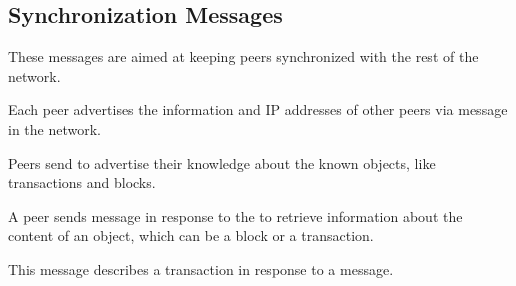 \subsection{Synchronization Messages}
These messages are aimed at keeping \bc peers synchronized with the rest of the \bc network. %

Each peer advertises the information and IP addresses of other peers via  message in the network. %

 Peers send  to advertise their knowledge about the known objects, like transactions and blocks.%

 A peer sends  message in response to the  to retrieve information about the content of an object, which can be a block or a transaction. 

 This message describes a transaction in response to a  message.%


